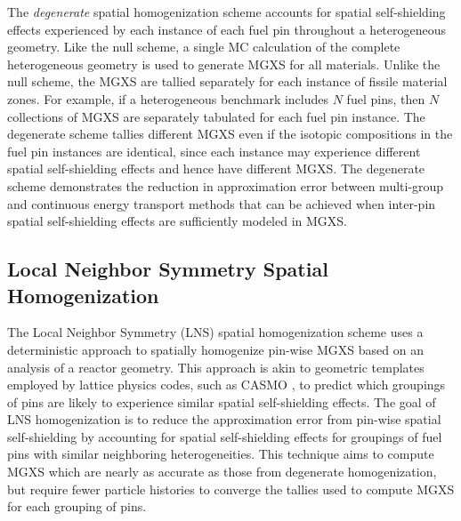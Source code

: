 The \textit{degenerate} spatial homogenization scheme accounts for spatial self-shielding effects experienced by each instance of each fuel pin throughout a heterogeneous geometry. Like the null scheme, a single MC calculation of the complete heterogeneous geometry is used to generate MGXS for all materials. Unlike the null scheme, the MGXS are tallied separately for each instance of fissile material zones. For example, if a heterogeneous benchmark includes $N$ fuel pins, then $N$ collections of MGXS are separately tabulated for each fuel pin instance. The degenerate scheme tallies different MGXS even if the isotopic compositions in the fuel pin instances are identical, since each instance may experience different spatial self-shielding effects and hence have different MGXS. The degenerate scheme demonstrates the reduction in approximation error between multi-group and continuous energy transport methods that can be achieved when inter-pin spatial self-shielding effects are sufficiently modeled in MGXS.

\subsection{Local Neighbor Symmetry Spatial Homogenization}
\label{subsec:homogenize-lns}

The Local Neighbor Symmetry (LNS) spatial homogenization scheme uses a deterministic approach to spatially homogenize pin-wise MGXS based on an analysis of a reactor geometry. This approach is akin to geometric templates employed by lattice physics codes, such as CASMO \citep{edenius1995casmo}, to predict which groupings of pins are likely to experience similar spatial self-shielding effects. The goal of LNS homogenization is to reduce the approximation error from pin-wise spatial self-shielding by accounting for spatial self-shielding effects for groupings of fuel pins with similar neighboring heterogeneities. This technique aims to compute MGXS which are nearly as accurate as those from degenerate homogenization, but require fewer particle histories to converge the tallies used to compute MGXS for each grouping of pins.



